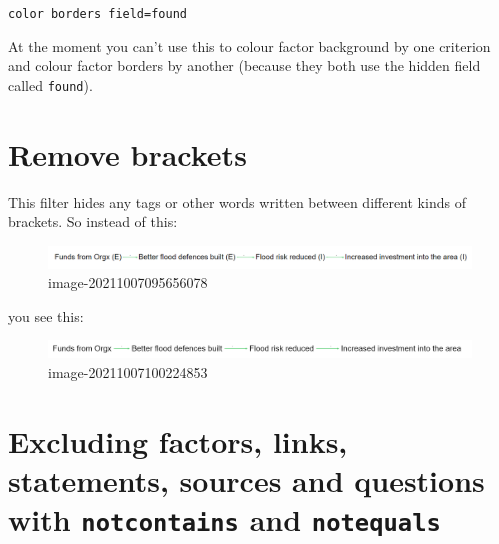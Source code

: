 \documentclass[
]{book}
\begin{document}
\texttt{color\ borders\ field=found}

At the moment you can't use this to colour factor background by one criterion and colour factor borders by another (because they both use the hidden field called \texttt{found}).

\hypertarget{remove-brackets}{%
\section{Remove brackets}\label{remove-brackets}}

This filter hides any tags or other words written between different kinds of brackets. So instead of this:

\begin{figure}
\centering
\includegraphics[width=6.77083in,height=\textheight]{_assets/image-20211007095656078.png}
\caption{image-20211007095656078}
\end{figure}

you see this:

\begin{figure}
\centering
\includegraphics[width=6.77083in,height=\textheight]{_assets/image-20211007100224853.png}
\caption{image-20211007100224853}
\end{figure}

\hypertarget{excluding-factors-links-statements-sources-and-questions-with-notcontains-and-notequals}{%
\section{\texorpdfstring{Excluding factors, links, statements, sources and questions with \texttt{notcontains} and \texttt{notequals}}{Excluding factors, links, statements, sources and questions with notcontains and notequals}}\label{excluding-factors-links-statements-sources-and-questions-with-notcontains-and-notequals}}
\end{document}
